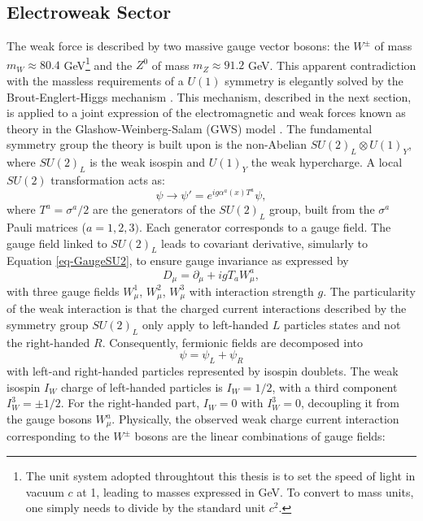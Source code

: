 \subsection{Electroweak Sector}
The weak force is described by two massive gauge vector bosons: the $W^{\pm}$ of mass $m_W \approx 80.4$ GeV\footnote{The unit system adopted throughtout this thesis is to set the speed of light in vacuum $c$ at 1, leading to masses expressed in GeV. To convert to mass units, one simply needs to divide by the standard unit $c^2$.} and the $Z^0$ of mass $m_Z \approx 91.2$ GeV. This apparent contradiction with the massless requirements of a $U(1)$ symmetry is elegantly solved by the Brout-Englert-Higgs mechanism \cite{Englert:1964et,  PhysRevLett.13.508}. This mechanism, described in the next section, is applied to a joint expression of the electromagnetic and weak forces known as  theory in the Glashow-Weinberg-Salam (GWS) model \cite{GLASHOW1961579, PhysRevLett.19.1264, Salam:1968rm}. The fundamental symmetry group the theory is built upon is the non-Abelian $SU(2)_L \otimes U(1)_Y$, where $SU(2)_L$ is the weak isospin and $U(1)_Y$ the weak hypercharge. A local $SU(2)$ transformation acts as:
\begin{equation}\label{eq-GaugeSU2}
    \psi \rightarrow \psi' = e^{i g \alpha^a(x) T^a } \psi,
\end{equation}
where $T^a = \sigma^a / 2$ are the generators of the $SU(2)_L$ group, built from the $\sigma^a$ Pauli matrices ($a = 1, 2, 3)$. Each generator corresponds to a gauge field. The gauge field linked to $SU(2)_L$ leads to covariant derivative, simularly to Equation \ref{eq-GaugeSU2}, to ensure gauge invariance as expressed by
\begin{equation}\label{eq-GaugeSU2}
   D_{\mu}  = \partial_{\mu} + igT_a W_{\mu}^a,
\end{equation}
with three gauge fields $W_{\mu}^1$, $W_{\mu}^2$, $W_{\mu}^3$ with interaction strength $g$. The particularity of the weak interaction is that the charged current interactions described by the symmetry group $SU(2)_L$ only apply to left-handed $L$ particles states and not the right-handed $R$. Consequently, fermionic fields are decomposed into \[\psi = \psi_L + \psi_R\] with left-and right-handed particles represented by isospin doublets. The weak isospin $I_W$ charge of left-handed particles is $I_W = 1/2$, with a third component $I_W^3 = \pm  1/2$. For the right-handed part, $I_W = 0$ with $I_W^3 = 0$, decoupling it from the gauge bosons $W_{\mu}^a$. Physically, the observed weak charge current interaction corresponding to the $W^{\pm}$ bosons are the linear combinations of gauge fields:
